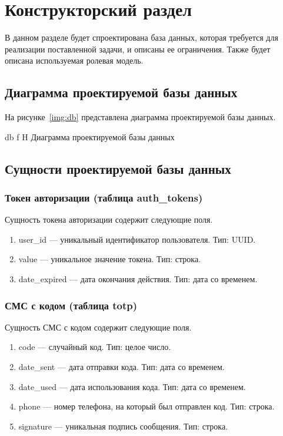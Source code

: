 \chapter{Конструкторский раздел}

В данном разделе будет спроектирована база данных, которая требуется для реализации поставленной задачи, и описаны ее ограничения. Также будет описана используемая ролевая модель.

\section{Диаграмма проектируемой базы данных}

На рисунке~\ref{img:db} представлена диаграмма проектируемой базы данных.

{db}
{f}
{H}
{\textwidth}
{Диаграмма проектируемой базы данных}

\section{Сущности проектируемой базы данных}

\subsection{Токен авторизации (таблица auth\_tokens)}

Сущность токена авторизации содержит следующие поля.

\begin{enumerate}
	\item user\_id --- уникальный идентификатор пользователя. Тип: UUID.
	\item value --- уникальное значение токена. Тип: строка.
	\item date\_expired --- дата окончания действия. Тип: дата со временем.
\end{enumerate}

\subsection{СМС с кодом (таблица totp)}

Сущность СМС с кодом содержит следующие поля.

\begin{enumerate}
	\item code --- случайный код. Тип: целое число.
	\item date\_sent --- дата отправки кода. Тип: дата со временем.
	\item date\_used --- дата использования кода. Тип: дата со временем.
	\item phone --- номер телефона, на который был отправлен код. Тип: строка.
	\item signature --- уникальная подпись сообщения. Тип: строка.
\end{enumerate}

